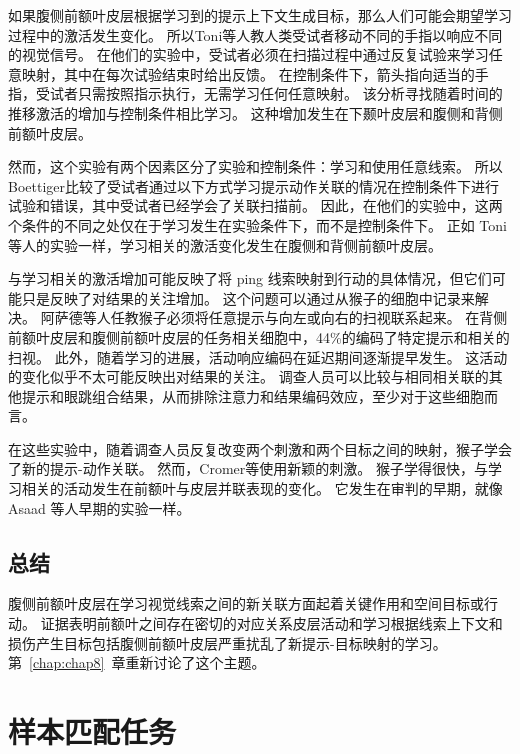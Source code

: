 如果腹侧前额叶皮层根据学习到的提示上下文生成目标，那么人们可能会期望学习过程中的激活发生变化。 
所以Toni等人\cite{toni2001learning}教人类受试者移动不同的手指以响应不同的视觉信号。 
在他们的实验中，受试者必须在扫描过程中通过反复试验来学习任意映射，其中在每次试验结束时给出反馈。
在控制条件下，箭头指向适当的手指，受试者只需按照指示执行，无需学习任何任意映射。
该分析寻找随着时间的推移激活的增加与控制条件相比学习。
这种增加发生在下颞叶皮层和腹侧和背侧前额叶皮层。
\par


然而，这个实验有两个因素区分了实验和控制条件：学习和使用任意线索。 
所以 Boettiger\cite{boettiger2005frontal}比较了受试者通过以下方式学习提示动作关联的情况在控制条件下进行试验和错误，其中受试者已经学会了关联扫描前。 
因此，在他们的实验中，这两个条件的不同之处仅在于学习发生在实验条件下，而不是控制条件下。 
正如 Toni 等人的实验一样\cite{toni2001learning}，学习相关的激活变化发生在腹侧和背侧前额叶皮层。
\par


与学习相关的激活增加可能反映了将 ping 线索映射到行动的具体情况，但它们可能只是反映了对结果的关注增加。
这个问题可以通过从猴子的细胞中记录来解决。
阿萨德等人\cite{asaad1998neural}任教猴子必须将任意提示与向左或向右的扫视联系起来。 
在背侧前额叶皮层和腹侧前额叶皮层的任务相关细胞中，44\%的编码了特定提示和相关的扫视。
此外，随着学习的进展，活动响应编码在延迟期间逐渐提早发生。
这活动的变化似乎不太可能反映出对结果的关注。
调查人员可以比较与相同相关联的其他提示和眼跳组合结果，从而排除注意力和结果编码效应，至少对于这些细胞而言。
\par


在这些实验中，随着调查人员反复改变两个刺激和两个目标之间的映射，猴子学会了新的提示-动作关联。 
然而，Cromer等\cite{cromer2011rapid}使用新颖的刺激。 猴子学得很快，与学习相关的活动发生在前额叶与皮层并联表现的变化。 
它发生在审判的早期，就像 Asaad 等人早期的实验一样\cite{asaad1998neural}。



\subsection{总结}

腹侧前额叶皮层在学习视觉线索之间的新关联方面起着关键作用和空间目标或行动。
证据表明前额叶之间存在密切的对应关系皮层活动和学习根据线索上下文和损伤产生目标包括腹侧前额叶皮层严重扰乱了新提示-目标映射的学习。
第~\ref{chap:chap8}~章重新讨论了这个主题。



\section{样本匹配任务}
\par

